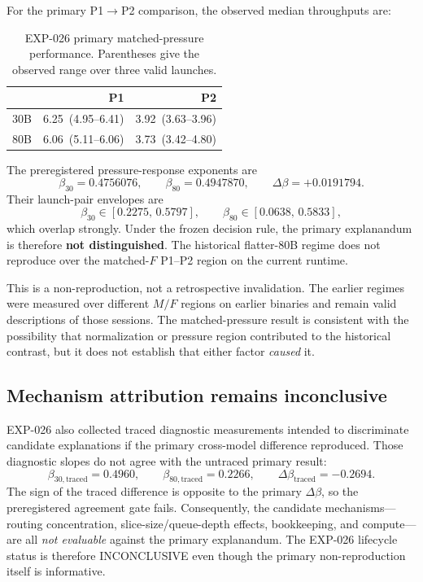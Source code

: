 For the primary P1$\rightarrow$P2 comparison, the observed median throughputs are:

\begin{table}[t]
    \centering
    \caption{EXP-026 primary matched-pressure performance. Parentheses give the observed range over three valid launches.}
    \label{tab:exp026-primary}
    \small
    \begin{tabular}{lrr}
        \toprule
        & P1 & P2 \\
        \midrule
        30B & 6.25\ (4.95--6.41) & 3.92\ (3.63--3.96) \\
        80B & 6.06\ (5.11--6.06) & 3.73\ (3.42--4.80) \\
        \bottomrule
    \end{tabular}
\end{table}

The preregistered pressure-response exponents are
\begin{equation}
    \beta_{30}=0.4756076,
    \qquad
    \beta_{80}=0.4947870,
    \qquad
    \Delta\beta=+0.0191794 .
    \label{eq:exp026-beta}
\end{equation}
Their launch-pair envelopes are
\[
    \beta_{30}\in[0.2275,\,0.5797],
    \qquad
    \beta_{80}\in[0.0638,\,0.5833],
\]
which overlap strongly. Under the frozen decision rule, the primary explanandum is therefore \textbf{not distinguished}. The historical flatter-80B regime does not reproduce over the matched-$F$ P1--P2 region on the current runtime.

This is a non-reproduction, not a retrospective invalidation. The earlier regimes were measured over different $M/F$ regions on earlier binaries and remain valid descriptions of those sessions. The matched-pressure result is consistent with the possibility that normalization or pressure region contributed to the historical contrast, but it does not establish that either factor \emph{caused} it.

\subsection{Mechanism attribution remains inconclusive}

EXP-026 also collected traced diagnostic measurements intended to discriminate candidate explanations if the primary cross-model difference reproduced. Those diagnostic slopes do not agree with the untraced primary result:
\[
    \beta_{30,\mathrm{traced}}=0.4960,
    \qquad
    \beta_{80,\mathrm{traced}}=0.2266,
    \qquad
    \Delta\beta_{\mathrm{traced}}=-0.2694.
\]
The sign of the traced difference is opposite to the primary $\Delta\beta$, so the preregistered agreement gate fails. Consequently, the candidate mechanisms---routing concentration, slice-size/queue-depth effects, bookkeeping, and compute---are all \emph{not evaluable} against the primary explanandum. The EXP-026 lifecycle status is therefore INCONCLUSIVE even though the primary non-reproduction itself is informative.

